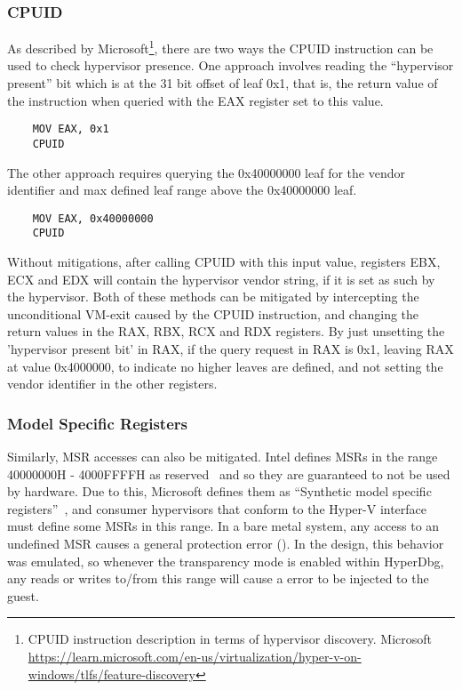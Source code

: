 \subsubsection{CPUID}
As described by Microsoft\footnote{CPUID instruction description in terms of hypervisor discovery. Microsoft \url{https://learn.microsoft.com/en-us/virtualization/hyper-v-on-windows/tlfs/feature-discovery}}, 
there are two ways the CPUID instruction can be used to check hypervisor presence. One approach involves reading the “hypervisor present” bit which is at the 31 bit offset of leaf 0x1, that is, the return value of the instruction when queried with the EAX register set to this value.
\begin{verbatim}
    MOV EAX, 0x1
    CPUID
\end{verbatim} 
The other approach requires querying the 0x40000000 leaf for the vendor identifier and max defined leaf range above the 0x40000000 leaf. 
\begin{verbatim}
    MOV EAX, 0x40000000
    CPUID
\end{verbatim}
Without mitigations, after calling CPUID with this input value, registers EBX, ECX and EDX will contain the hypervisor vendor string, if it is set as such by the hypervisor.
Both of these methods can be mitigated by intercepting the unconditional VM-exit caused by the CPUID instruction, and changing the return values in the RAX, RBX, RCX and RDX registers. 
By just unsetting the 'hypervisor present bit' in RAX, if the query request in RAX is 0x1, leaving RAX at value 0x4000000, to indicate no higher leaves are defined, and not setting the vendor identifier in the other registers.

\subsubsection{Model Specific Registers}
Similarly, MSR accesses can also be mitigated. Intel defines MSRs in the range 40000000H - 4000FFFFH as reserved~\cite[Volume 4]{Intel-SDM2025} and so they are guaranteed to not be used by hardware. 
Due to this, Microsoft defines them as “Synthetic model specific registers”~\cite{microsoft_hv_interface_reqs}, and consumer hypervisors that conform to the Hyper-V  interface must define some MSRs in this range. 
In a bare metal system, any access to an undefined MSR causes a general protection error (). In the design, this behavior was emulated, 
so whenever the transparency mode is enabled within HyperDbg, any reads or writes to/from this range will cause a  error to be injected to the guest.

